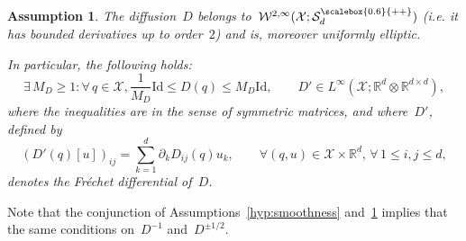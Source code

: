 \documentclass[10pt]{article}
\newcommand{\R}{\mathbb{R}}
\newcommand{\cX}{\mathcal{X}}
\newcommand{\cSpd}{\mathcal{S}_d^{\scalebox{0.6}{++}}}
\newcommand{\1}{\mathbbm 1}
\newcommand{\Id}{\mathrm{Id}}
\newcommand{\cW}{\mathcal{W}}
\newtheorem{hypothesis}{Assumption}
\begin{document}
\begin{hypothesis}
    \label{hyp:elliptic}
    The diffusion~$D$ belongs to~$\cW^{2,\infty}(\cX;\cSpd)$ (i.e. it has bounded derivatives up to order~$2$) and is, moreover uniformly elliptic.
    
    In particular, the following holds:
    \begin{equation}
        \label{eq:elliptic}
        \exists\,M_D \geq 1:\forall\,q\in\cX, \frac1{M_D}\Id \leq D(q) \leq M_D \Id,\qquad D'\in L^\infty\left(\cX;\R^d\otimes \R^{d\times d}\right),
    \end{equation}
    where the inequalities are in the sense of symmetric matrices, and where~$D'$, defined by
    \begin{equation}
        \label{eq:diff_notation}
        \left(D'(q)\left[u\right] \right)_{ij} = \sum_{k=1}^d \partial_k D_{ij}(q)u_k,\qquad \forall (q,u)\in \cX\times\R^d,\,\forall\, 1\leq i,j\leq d,
    \end{equation}
    denotes the Fr\'echet differential of~$D$.
\end{hypothesis}
Note that the conjunction of Assumptions~\ref{hyp:smoothness} and~\ref{hyp:elliptic} implies that the same conditions on~$D^{-1}$ and~$D^{\pm1/2}$.
    
\end{document}
